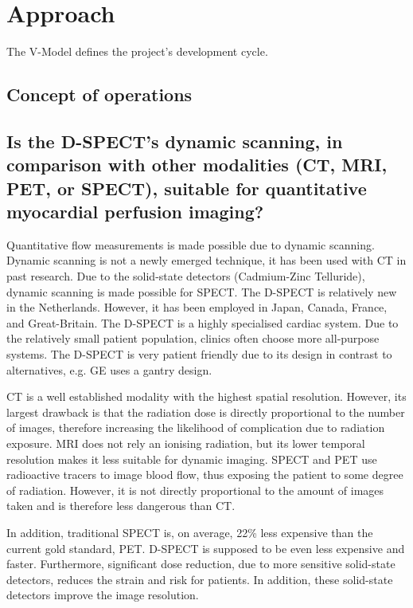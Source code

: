 \section{Approach}
The V-Model defines the project's development cycle. 

\subsection{Concept of operations}
\subsection*{Is the D-SPECT's dynamic scanning, in comparison with other modalities (CT, MRI, PET, or SPECT), suitable for quantitative myocardial perfusion imaging?}
\label{sec:concept_oper}
Quantitative flow measurements is made possible due to dynamic scanning. Dynamic scanning is not a newly emerged technique, it has been used with \ac{CT} in past research. Due to the solid-state detectors (Cadmium-Zinc Telluride), dynamic scanning is made possible for \ac{SPECT}. The D-SPECT is relatively new in the Netherlands. However, it has been employed in Japan, Canada, France, and Great-Britain. The D-SPECT is a highly specialised cardiac system. Due to the relatively small patient population, clinics often choose more all-purpose systems. The D-SPECT is very patient friendly due to its design in contrast to alternatives, e.g. GE uses a gantry design.

\ac{CT} is a well established modality with the highest spatial resolution. However, its largest drawback is that the radiation dose is directly proportional to the number of images, therefore increasing the likelihood of complication due to radiation exposure. \ac{MRI} does not rely an ionising radiation, but its lower temporal resolution makes it less suitable for dynamic imaging. \ac{SPECT} and \ac{PET} use radioactive tracers to image blood flow, thus exposing the patient to some degree of radiation. However, it is not directly proportional to the amount of images taken and is therefore less dangerous than \ac{CT}.

In addition, traditional \ac{SPECT} is, on average, 22\% less expensive than the current gold standard, \ac{PET}. D-SPECT is supposed to be even less expensive and faster. Furthermore, significant dose reduction, due to more sensitive solid-state detectors, reduces the strain and risk for patients. In addition, these solid-state detectors improve the image resolution. 

